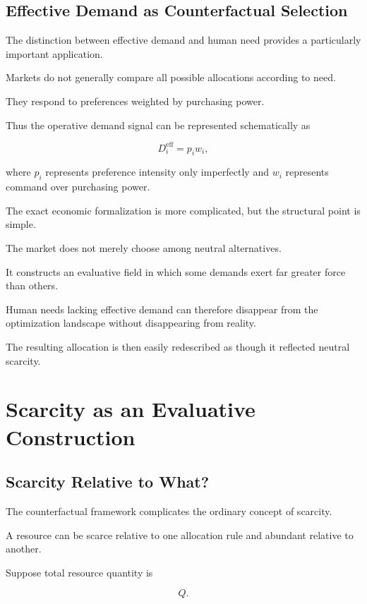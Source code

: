 \documentclass[11pt]{article}
\theoremstyle{remark}
\begin{document}
\subsection{Effective Demand as Counterfactual Selection}

The distinction between effective demand and human need provides a particularly important application.

Markets do not generally compare all possible allocations according to need.

They respond to preferences weighted by purchasing power.

Thus the operative demand signal can be represented schematically as

\begin{equation}
D_i^{\mathrm{eff}}
=
p_i w_i,
\end{equation}

where $p_i$ represents preference intensity only imperfectly and $w_i$ represents command over purchasing power.

The exact economic formalization is more complicated, but the structural point is simple.

The market does not merely choose among neutral alternatives.

It constructs an evaluative field in which some demands exert far greater force than others.

Human needs lacking effective demand can therefore disappear from the optimization landscape without disappearing from reality.

The resulting allocation is then easily redescribed as though it reflected neutral scarcity.

\section{Scarcity as an Evaluative Construction}

\subsection{Scarcity Relative to What?}

The counterfactual framework complicates the ordinary concept of scarcity.

A resource can be scarce relative to one allocation rule and abundant relative to another.

Suppose total resource quantity is

\begin{equation}
Q.
\end{equation}
\end{document}
